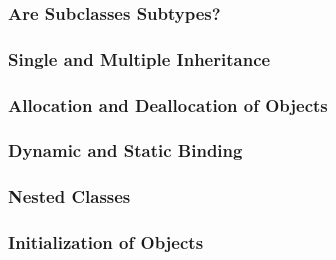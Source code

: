 \subsubsection{Are Subclasses Subtypes?}\label{subsubsec:OOP_Subclasses_Subtypes}
\subsubsection{Single and Multiple Inheritance}\label{subsubsec:OOP_Single_Multiple_Inheritance}
\subsubsection{Allocation and Deallocation of Objects}\label{subsubsec:OOP_Object_Allocation_Deallocation}
\subsubsection{Dynamic and Static Binding}\label{subsubsec:OOP_Dynamic_Static_Binding}
\subsubsection{Nested Classes}\label{subsubsec:OOP_Nested_Classes}
\subsubsection{Initialization of Objects}\label{subsubsec:OOP_Object_Initialization}

